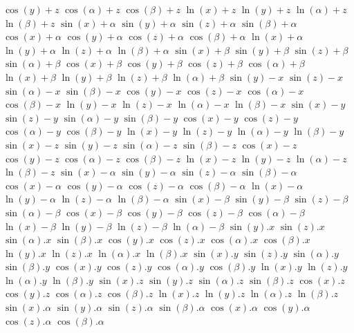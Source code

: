 $ \cos(y) + z $
$ \cos(\alpha) + z $
$ \cos(\beta) + z $
$ \ln(x) + z $
$ \ln(y) + z $
$ \ln(\alpha) + z $
$ \ln(\beta) + z $
$ \sin(x) + \alpha $
$ \sin(y) + \alpha $
$ \sin(z) + \alpha $
$ \sin(\beta) + \alpha $
$ \cos(x) + \alpha $
$ \cos(y) + \alpha $
$ \cos(z) + \alpha $
$ \cos(\beta) + \alpha $
$ \ln(x) + \alpha $
$ \ln(y) + \alpha $
$ \ln(z) + \alpha $
$ \ln(\beta) + \alpha $
$ \sin(x) + \beta $
$ \sin(y) + \beta $
$ \sin(z) + \beta $
$ \sin(\alpha) + \beta $
$ \cos(x) + \beta $
$ \cos(y) + \beta $
$ \cos(z) + \beta $
$ \cos(\alpha) + \beta $
$ \ln(x) + \beta $
$ \ln(y) + \beta $
$ \ln(z) + \beta $
$ \ln(\alpha) + \beta $
$ \sin(y) - x $
$ \sin(z) - x $
$ \sin(\alpha) - x $
$ \sin(\beta) - x $
$ \cos(y) - x $
$ \cos(z) - x $
$ \cos(\alpha) - x $
$ \cos(\beta) - x $
$ \ln(y) - x $
$ \ln(z) - x $
$ \ln(\alpha) - x $
$ \ln(\beta) - x $
$ \sin(x) - y $
$ \sin(z) - y $
$ \sin(\alpha) - y $
$ \sin(\beta) - y $
$ \cos(x) - y $
$ \cos(z) - y $
$ \cos(\alpha) - y $
$ \cos(\beta) - y $
$ \ln(x) - y $
$ \ln(z) - y $
$ \ln(\alpha) - y $
$ \ln(\beta) - y $
$ \sin(x) - z $
$ \sin(y) - z $
$ \sin(\alpha) - z $
$ \sin(\beta) - z $
$ \cos(x) - z $
$ \cos(y) - z $
$ \cos(\alpha) - z $
$ \cos(\beta) - z $
$ \ln(x) - z $
$ \ln(y) - z $
$ \ln(\alpha) - z $
$ \ln(\beta) - z $
$ \sin(x) - \alpha $
$ \sin(y) - \alpha $
$ \sin(z) - \alpha $
$ \sin(\beta) - \alpha $
$ \cos(x) - \alpha $
$ \cos(y) - \alpha $
$ \cos(z) - \alpha $
$ \cos(\beta) - \alpha $
$ \ln(x) - \alpha $
$ \ln(y) - \alpha $
$ \ln(z) - \alpha $
$ \ln(\beta) - \alpha $
$ \sin(x) - \beta $
$ \sin(y) - \beta $
$ \sin(z) - \beta $
$ \sin(\alpha) - \beta $
$ \cos(x) - \beta $
$ \cos(y) - \beta $
$ \cos(z) - \beta $
$ \cos(\alpha) - \beta $
$ \ln(x) - \beta $
$ \ln(y) - \beta $
$ \ln(z) - \beta $
$ \ln(\alpha) - \beta $
$ \sin(y) . x $
$ \sin(z) . x $
$ \sin(\alpha) . x $
$ \sin(\beta) . x $
$ \cos(y) . x $
$ \cos(z) . x $
$ \cos(\alpha) . x $
$ \cos(\beta) . x $
$ \ln(y) . x $
$ \ln(z) . x $
$ \ln(\alpha) . x $
$ \ln(\beta) . x $
$ \sin(x) . y $
$ \sin(z) . y $
$ \sin(\alpha) . y $
$ \sin(\beta) . y $
$ \cos(x) . y $
$ \cos(z) . y $
$ \cos(\alpha) . y $
$ \cos(\beta) . y $
$ \ln(x) . y $
$ \ln(z) . y $
$ \ln(\alpha) . y $
$ \ln(\beta) . y $
$ \sin(x) . z $
$ \sin(y) . z $
$ \sin(\alpha) . z $
$ \sin(\beta) . z $
$ \cos(x) . z $
$ \cos(y) . z $
$ \cos(\alpha) . z $
$ \cos(\beta) . z $
$ \ln(x) . z $
$ \ln(y) . z $
$ \ln(\alpha) . z $
$ \ln(\beta) . z $
$ \sin(x) . \alpha $
$ \sin(y) . \alpha $
$ \sin(z) . \alpha $
$ \sin(\beta) . \alpha $
$ \cos(x) . \alpha $
$ \cos(y) . \alpha $
$ \cos(z) . \alpha $
$ \cos(\beta) . \alpha $
